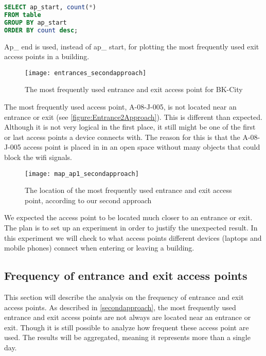 \begin{lstlisting}[language=SQL]
SELECT ap_start, count(*)
FROM table
GROUP BY ap_start
ORDER BY count desc;
\end{lstlisting}	

Ap\_ end is used, instead of ap\_ start, for plotting the most frequently used exit access points in a building.

\begin{figure}[H]
\centering
\texttt{[image: entrances\_secondapproach]}
\captionsetup{justification=centering}
\caption{The most frequently used entrance and exit access point for BK-City
}
\label{figure:Entrance2Approach}
\end{figure}

The most frequently used access point, A-08-J-005, is not located near an entrance or exit (see \autoref{figure:Entrance2Approach}). This is different than expected. Although it is not very logical in the first place, it still might be one of the first or last access points a device connects with. The reason for this is that the A-08-J-005 access point is placed in in an open space without many objects that could block the wifi signals.

\begin{figure}[H]
\centering
\texttt{[image: map\_ap1\_secondapproach]}
\captionsetup{justification=centering}
\caption{The location of the most frequently used entrance and exit access point, according to our second approach
}
\label{figure:Entrance2Approachaploc}
\end{figure}

We expected the access point to be located much closer to an entrance or exit. The plan is to set up an experiment in order to justify the unexpected result. In this experiment we will check to what access points different devices (laptops and mobile phones) connect when entering or leaving a building.

\subsection{Frequency of entrance and exit access points}
This section will describe the analysis on the frequency of entrance and exit access points. As described in \autoref{secondapproach}, the most frequently used entrance and exit access points are not always are located near an entrance or exit. Though it is still possible to analyze how frequent these access point are used. The results will be aggregated, meaning it represents more than a single day.

